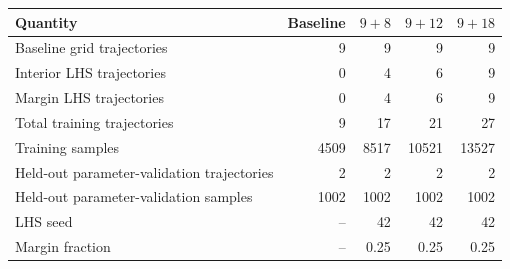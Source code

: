 \begin{tabular}{lrrrr}
\toprule
Quantity & Baseline & $9+8$ & $9+12$ & $9+18$ \\
\midrule
Baseline grid trajectories & 9 & 9 & 9 & 9 \\
Interior LHS trajectories & 0 & 4 & 6 & 9 \\
Margin LHS trajectories & 0 & 4 & 6 & 9 \\
Total training trajectories & 9 & 17 & 21 & 27 \\
Training samples & 4509 & 8517 & 10521 & 13527 \\
Held-out parameter-validation trajectories & 2 & 2 & 2 & 2 \\
Held-out parameter-validation samples & 1002 & 1002 & 1002 & 1002 \\
LHS seed & -- & 42 & 42 & 42 \\
Margin fraction & -- & 0.25 & 0.25 & 0.25 \\
\bottomrule
\end{tabular}

